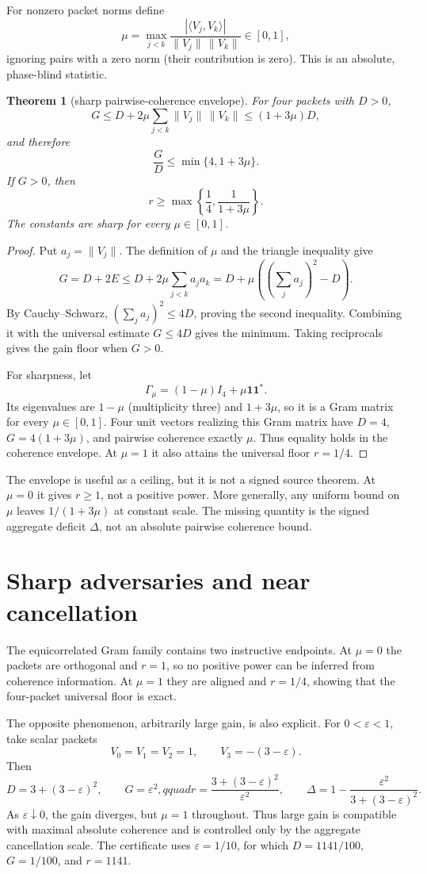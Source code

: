 \documentclass[11pt]{article}
\newtheorem{theorem}{Theorem}
\begin{document}
For nonzero packet norms define
\[
 \mu=\max_{j<k}
 \frac{|\langle V_j,V_k\rangle|}{\|V_j\|\,\|V_k\|}\in[0,1],
\]
ignoring pairs with a zero norm (their contribution is zero).  This is an
absolute, phase-blind statistic.

\begin{theorem}[sharp pairwise-coherence envelope]
For four packets with $D>0$,
\[
 G\leq D+2\mu\sum_{j<k}\|V_j\|\,\|V_k\|
 \leq(1+3\mu)D,
\]
and therefore
\[
 \frac GD\leq\min\{4,1+3\mu\}.
\]
If $G>0$, then
\[
 r\geq\max\left\{\frac14,\frac1{1+3\mu}\right\}.
\]
The constants are sharp for every $\mu\in[0,1]$.
\end{theorem}

\begin{proof}
Put $a_j=\|V_j\|$.  The definition of $\mu$ and the triangle inequality
give
\[
 G=D+2E\leq D+2\mu\sum_{j<k}a_ja_k
 =D+\mu\left(\left(\sum_ja_j\right)^2-D\right).
\]
By Cauchy--Schwarz, $(\sum_ja_j)^2\leq4D$, proving the second inequality.
Combining it with the universal estimate $G\leq4D$ gives the minimum.
Taking reciprocals gives the gain floor when $G>0$.

For sharpness, let
\[
 \Gamma_\mu=(1-\mu)I_4+\mu\mathbf1\mathbf1^*.
\]
Its eigenvalues are $1-\mu$ (multiplicity three) and $1+3\mu$, so it is a
Gram matrix for every $\mu\in[0,1]$.  Four unit vectors realizing this Gram
matrix have $D=4$, $G=4(1+3\mu)$, and pairwise coherence exactly $\mu$.
Thus equality holds in the coherence envelope.  At $\mu=1$ it also attains
the universal floor $r=1/4$.
\end{proof}

The envelope is useful as a ceiling, but it is not a signed source theorem.
At $\mu=0$ it gives $r\geq1$, not a positive power.  More generally, any
uniform bound on $\mu$ leaves $1/(1+3\mu)$ at constant scale.  The missing
quantity is the signed aggregate deficit $\Delta$, not an absolute pairwise
coherence bound.

\section{Sharp adversaries and near cancellation}

The equicorrelated Gram family contains two instructive endpoints.  At
$\mu=0$ the packets are orthogonal and $r=1$, so no positive power can be
inferred from coherence information.  At $\mu=1$ they are aligned and
$r=1/4$, showing that the four-packet universal floor is exact.

The opposite phenomenon, arbitrarily large gain, is also explicit.  For
$0<\varepsilon<1$, take scalar packets
\[
 V_0=V_1=V_2=1,\qquad V_3=-(3-\varepsilon).
\]
Then
\[
 D=3+(3-\varepsilon)^2,\qquad G=\varepsilon^2,qquad
 r=\frac{3+(3-\varepsilon)^2}{\varepsilon^2},
\qquad
 \Delta=1-\frac{\varepsilon^2}{3+(3-\varepsilon)^2}.
\]
As $\varepsilon\downarrow0$, the gain diverges, but $\mu=1$ throughout.
Thus large gain is compatible with maximal absolute coherence and is
controlled only by the aggregate cancellation scale.  The certificate uses
$\varepsilon=1/10$, for which $D=1141/100$, $G=1/100$, and $r=1141$.
\end{document}
